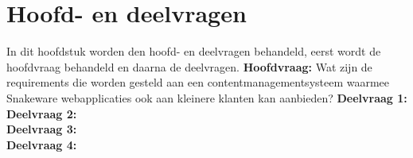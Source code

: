 \section{Hoofd- en deelvragen}
In dit hoofdstuk worden den hoofd- en deelvragen behandeld, eerst wordt de hoofdvraag behandeld en daarna de deelvragen.
\whitespace
\textbf{Hoofdvraag:} Wat zijn de requirements die worden gesteld aan een contentmanagementsysteem waarmee
Snakeware webapplicaties ook aan kleinere klanten kan aanbieden?
\whitespace
\textbf{Deelvraag 1:} \SubquestionOne   \\
\textbf{Deelvraag 2:} \SubquestionTwo   \\
\textbf{Deelvraag 3:} \SubquestionThree \\
\textbf{Deelvraag 4:} \SubquestionFour  \\
